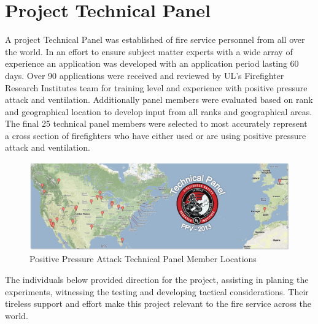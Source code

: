 \documentclass{article}
\begin{document}
\clearpage

\section{Project Technical Panel}

A project Technical Panel was established of fire service personnel from all over the world. In an effort to ensure subject matter experts with a wide array of experience an application was developed with an application period lasting 60 days. Over 90 applications were received and reviewed by UL's Firefighter Research Institutes team for training level and experience with positive pressure attack and ventilation. Additionally panel members were evaluated based on rank and geographical location to develop input from all ranks and geographical areas. The final 25 technical panel members were selected to most accurately represent a cross section of firefighters who have either used or are using positive pressure attack and ventilation. 

\begin{figure}[H]
	\centering
	\includegraphics[width = 5in]{0_Images/Technical_Panel/TechnicalPanelLocations.png} 
	\caption{Positive Pressure Attack Technical Panel Member Locations}
	\label{fig:PanelLocatoins}
\end{figure} 

The individuals below provided direction for the project, assisting in planing the experiments, witnessing the testing and developing tactical considerations. Their tireless support and effort make this project relevant to the fire service across the world. 

\renewcommand{\arraystretch}{1.5}
\end{document}
